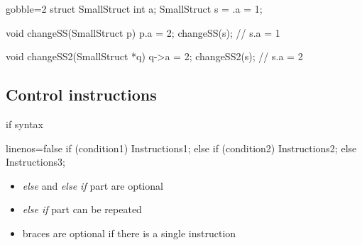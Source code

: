 \begin{frame}[fragile]
  \begin{multicols}{2}
    \begin{cppcode*}{gobble=2}
      struct SmallStruct {int a};
      SmallStruct s = {.a = 1};
      
      void changeSS(SmallStruct p) {
        p.a = 2;
      }
      changeSS(s);
      // s.a = 1
      
      void changeSS2(SmallStruct *q) {
        q->a = 2;
      }
      changeSS2(s);
      // s.a = 2
    \end{cppcode*}
    \columnbreak
    \null \vfill
    \vfill \null
  \end{multicols}
\end{frame}

\subsection[Control]{Control instructions}

\begin{frame}[fragile]
  \begin{block}{if syntax}
    \begin{cppcode*}{linenos=false}
      if (condition1) {
        Instructions1;
      } else if (condition2) {
        Instructions2;
      } else {
        Instructions3;
      } 
    \end{cppcode*}
    \vspace{-0.5cm}
    \begin{itemize}
      \item {\it else} and {\it else if} part are optional
      \item {\it else if} part can be repeated
      \item braces are optional if there is a single instruction
    \end{itemize}
  \end{block}
\end{frame}

